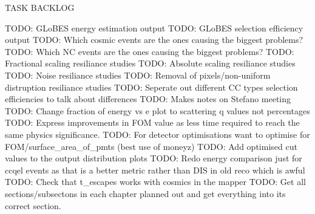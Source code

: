 TASK BACKLOG

TODO: GLoBES energy estimation output
TODO: GLoBES selection efficiency output
TODO: Which cosmic events are the ones causing the biggest problems?
TODO: Which NC events are the ones causing the biggest problems?
TODO: Fractional scaling resiliance studies
TODO: Absolute scaling resiliance studies
TODO: Noise resiliance studies
TODO: Removal of pixels/non-uniform distruption resiliance studies
TODO: Seperate out different CC types selection efficiencies to talk about differences
TODO: Makes notes on Stefano meeting
TODO: Change fraction of energy vs e plot to scattering q values not percentages
TODO: Express improvements in FOM value as less time required to reach the same physics significance.
TODO: For detector optimisations want to optimise for FOM/surface_area_of_pmts (best use of moneyz)
TODO: Add optimised cut values to the output distribution plots
TODO: Redo energy comparison just for ccqel events as that is a better metric rather than DIS in old reco which is awful
TODO: Check that t_escapes works with cosmics in the mapper
TODO: Get all sections/subsectons in each chapter planned out and get everything into its correct section.